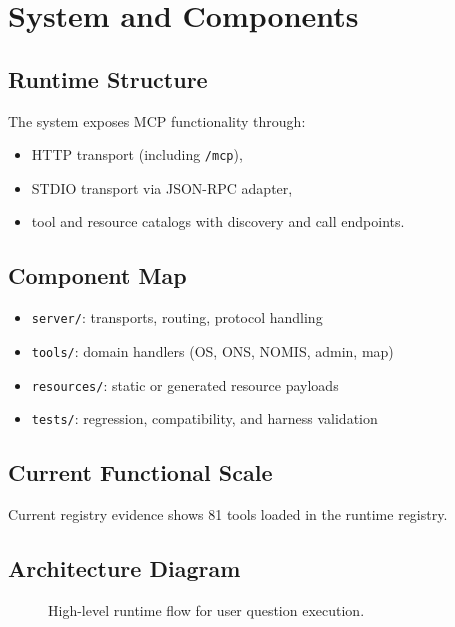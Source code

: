 \chapter{System and Components}
\label{ch:system}

\section{Runtime Structure}

The system exposes MCP functionality through:
\begin{itemize}
  \item HTTP transport (including \texttt{/mcp}),
  \item STDIO transport via JSON-RPC adapter,
  \item tool and resource catalogs with discovery and call endpoints.
\end{itemize}

\section{Component Map}

\begin{itemize}
  \item \texttt{server/}: transports, routing, protocol handling
  \item \texttt{tools/}: domain handlers (OS, ONS, NOMIS, admin, map)
  \item \texttt{resources/}: static or generated resource payloads
  \item \texttt{tests/}: regression, compatibility, and harness validation
\end{itemize}

\section{Current Functional Scale}

Current registry evidence shows 81 tools loaded in the runtime registry.

\section{Architecture Diagram}

\begin{figure}[h]
\centering
{}
\caption{High-level runtime flow for user question execution.}
\end{figure}
